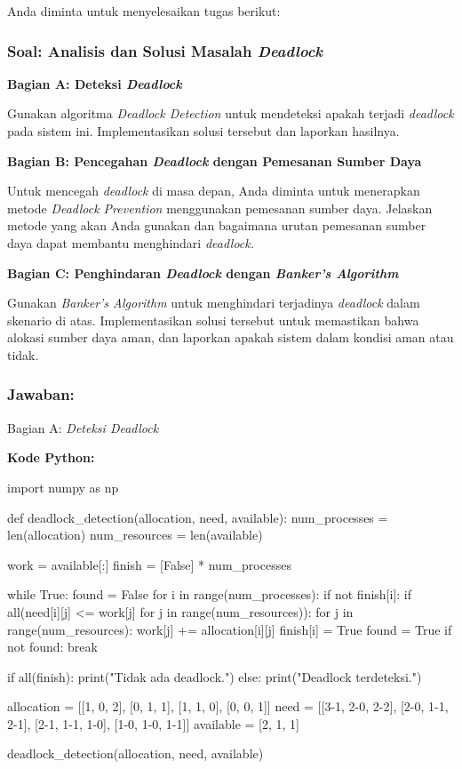 \documentclass[12pt]{article}
\begin{document}
Anda diminta untuk menyelesaikan tugas berikut:

\subsubsection{Soal: Analisis dan Solusi Masalah \textit{Deadlock}}

\textbf{Bagian A: Deteksi \textit{Deadlock}}

Gunakan algoritma \textit{Deadlock Detection} untuk mendeteksi apakah terjadi \textit{deadlock} pada sistem ini. Implementasikan solusi tersebut dan laporkan hasilnya.

\textbf{Bagian B: Pencegahan \textit{Deadlock} dengan Pemesanan Sumber Daya}

Untuk mencegah \textit{deadlock} di masa depan, Anda diminta untuk menerapkan metode \textit{Deadlock Prevention} menggunakan pemesanan sumber daya. Jelaskan metode yang akan Anda gunakan dan bagaimana urutan pemesanan sumber daya dapat membantu menghindari \textit{deadlock.}

\textbf{Bagian C: Penghindaran \textit{Deadlock} dengan \textit{Banker's Algorithm}}

Gunakan \textit{Banker's Algorithm} untuk menghindari terjadinya \textit{deadlock} dalam skenario di atas. Implementasikan solusi tersebut untuk memastikan bahwa alokasi sumber daya aman, dan laporkan apakah sistem dalam kondisi aman atau tidak.

\subsubsection{Jawaban:}

Bagian A: \textit{Deteksi Deadlock}

\textbf{Kode Python:}

\begin{python}
import numpy as np

def deadlock_detection(allocation, need, available):
    num_processes = len(allocation)
    num_resources = len(available)
    
    work = available[:]
    finish = [False] * num_processes
    
    while True:
        found = False
        for i in range(num_processes):
            if not finish[i]:
                if all(need[i][j] <= work[j] for j in range(num_resources)):
                    for j in range(num_resources):
                        work[j] += allocation[i][j]
                    finish[i] = True
                    found = True
        if not found:
            break
    
    if all(finish):
        print("Tidak ada deadlock.")
    else:
        print("Deadlock terdeteksi.")

allocation = [[1, 0, 2], [0, 1, 1], [1, 1, 0], [0, 0, 1]]
need = [[3-1, 2-0, 2-2], [2-0, 1-1, 2-1], [2-1, 1-1, 1-0], [1-0, 1-0, 1-1]]
available = [2, 1, 1]

deadlock_detection(allocation, need, available)
\end{python}
\end{document}
